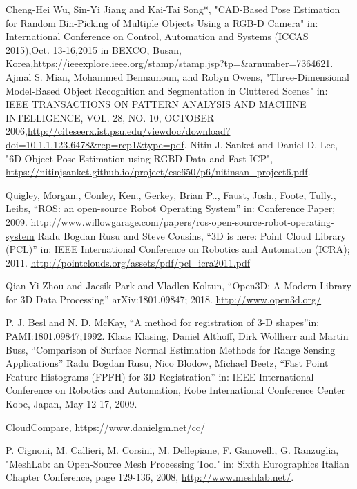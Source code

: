 \begin{thebibliography}{1}
		Cheng-Hei Wu, Sin-Yi Jiang and Kai-Tai Song*,
		"CAD-Based Pose Estimation for Random Bin-Picking of Multiple Objects Using a RGB-D Camera" in: International Conference on Control, Automation and Systems (ICCAS 2015),Oct. 13-16,2015 in BEXCO, Busan, Korea,\url{https://ieeexplore.ieee.org/stamp/stamp.jsp?tp=&arnumber=7364621}.
		Ajmal S. Mian, Mohammed Bennamoun, and Robyn Owens,
		"Three-Dimensional Model-Based Object Recognition and Segmentation in Cluttered Scenes" in: IEEE TRANSACTIONS ON PATTERN ANALYSIS AND MACHINE INTELLIGENCE,  VOL. 28,  NO. 10,  OCTOBER 2006,\url{http://citeseerx.ist.psu.edu/viewdoc/download?doi=10.1.1.123.6478&rep=rep1&type=pdf}.
		Nitin J. Sanket and Daniel D. Lee,
		"6D  Object  Pose  Estimation  using  RGBD  Data  and  Fast-ICP", \url{https://nitinjsanket.github.io/project/ese650/p6/nitinsan_project6.pdf}.

		Quigley, Morgan., Conley, Ken., Gerkey, Brian P.., Faust, Josh., Foote, Tully., Leibs,
		``ROS: an open-source Robot Operating System'' in: Conference Paper; 2009. \url{http://www.willowgarage.com/papers/ros-open-source-robot-operating-system}	
		Radu Bogdan Rusu and Steve Cousins,
		``3D is here: Point Cloud Library (PCL)'' in: IEEE International Conference on Robotics and Automation (ICRA); 2011. \url{http://pointclouds.org/assets/pdf/pcl_icra2011.pdf}
	
	Qian-Yi Zhou and Jaesik Park and Vladlen Koltun,
	``{Open3D}: {A} Modern Library for {3D} Data Processing'' arXiv:1801.09847; 2018. \url{http://www.open3d.org/}

		P. J. Besl and N. D. McKay,
		``A method for registration of 3-D shapes''in: PAMI:1801.09847;1992.
		Klaas Klasing, Daniel Althoff, Dirk Wollherr and Martin Buss,
		``Comparison of  Surface Normal Estimation  Methods for Range Sensing Applications'' 
		Radu Bogdan Rusu, Nico Blodow, Michael Beetz,
		``Fast Point Feature Histograms (FPFH) for 3D Registration'' in: IEEE International Conference on Robotics and Automation, Kobe International Conference Center Kobe, Japan, May 12-17, 2009.
		
		CloudCompare,
		\url{https://www.danielgm.net/cc/}

		P. Cignoni, M. Callieri, M. Corsini, M. Dellepiane, F. Ganovelli, G. Ranzuglia,
		"MeshLab: an Open-Source Mesh Processing Tool" in: Sixth Eurographics Italian Chapter Conference, page 129-136, 2008, \url{http://www.meshlab.net/}.


\end{thebibliography}
